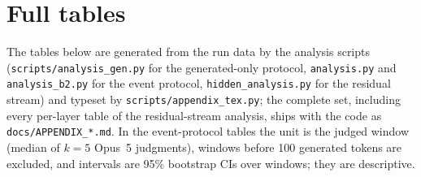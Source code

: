 

\section{Full tables}
\label{app:loop}

The tables below are generated from the run data by the analysis scripts
(\texttt{scripts/analysis\_gen.py} for the generated-only protocol,
\texttt{analysis.py} and \texttt{analysis\_b2.py} for the event protocol,
\texttt{hidden\_analysis.py} for the residual stream) and typeset by
\texttt{scripts/appendix\_tex.py}; the complete set, including every per-layer
table of the residual-stream analysis, ships with the code as
\texttt{docs/APPENDIX\_*.md}. In the event-protocol tables the unit is the
judged window (median of $k=5$ Opus~5 judgments), windows before 100
generated tokens are excluded, and intervals are 95\% bootstrap CIs over
windows; they are descriptive.


